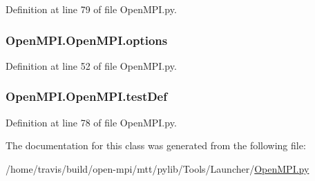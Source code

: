 Definition at line 79 of file Open\-M\-P\-I.\-py.

\hypertarget{class_open_m_p_i_1_1_open_m_p_i_a4a263774614f0b83a63a26639b46b2f5}{
\subsubsection[{options}]{\setlength{\rightskip}{0pt plus 5cm}Open\-M\-P\-I.\-Open\-M\-P\-I.\-options}}\label{class_open_m_p_i_1_1_open_m_p_i_a4a263774614f0b83a63a26639b46b2f5}


Definition at line 52 of file Open\-M\-P\-I.\-py.

\hypertarget{class_open_m_p_i_1_1_open_m_p_i_acd20b78013350c2363484589ef85b67c}{
\subsubsection[{test\-Def}]{\setlength{\rightskip}{0pt plus 5cm}Open\-M\-P\-I.\-Open\-M\-P\-I.\-test\-Def}}\label{class_open_m_p_i_1_1_open_m_p_i_acd20b78013350c2363484589ef85b67c}


Definition at line 78 of file Open\-M\-P\-I.\-py.



The documentation for this class was generated from the following file\-:\begin{DoxyCompactItemize}
\item 
/home/travis/build/open-\/mpi/mtt/pylib/\-Tools/\-Launcher/\hyperlink{_open_m_p_i_8py}{Open\-M\-P\-I.\-py}\end{DoxyCompactItemize}
